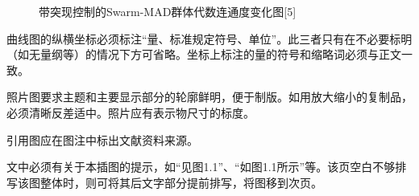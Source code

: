 \begin{figure} 
	\centering 
	\hspace{1in} 
	\caption{带突现控制的Swarm-MAD群体代数连通度变化图[5]} 
	\label{fig:subfig} %
\end{figure}

曲线图的纵横坐标必须标注“量、标准规定符号、单位”。此三者只有在不必要标明（如无量纲等）的情况下方可省略。坐标上标注的量的符号和缩略词必须与正文一致。

照片图要求主题和主要显示部分的轮廓鲜明，便于制版。如用放大缩小的复制品，必须清晰反差适中。照片应有表示物尺寸的标度。

引用图应在图注中标出文献资料来源。

文中必须有关于本插图的提示，如“见图1.1”、“如图1.1所示”等。该页空白不够排写该图整体时，则可将其后文字部分提前排写，将图移到次页。

